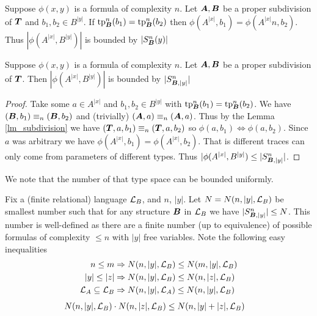 \documentclass{amsart}
\DeclareMathOperator{\TT}{\boldface T}
\DeclareMathOperator{\A}{\boldface A}
\DeclareMathOperator{\B}{\boldface B}
\begin{document}
\begin{Corollary} \label{cor_type_count}
	Suppose $\phi(x,y)$ is a formula of complexity $n$. Let $\A, \B$ be a proper subdivision of $\TT$ and $b_1, b_2 \in B^{|y|}$. If $\tp^n_{\B}(b_1) = \tp^n_{\B}(b_2)$ then $\phi(A^{|x|}, b_1) = \phi(A^{|x|} n, b_2)$. Thus $|\phi(A^{|x|}, B^{|y|})|$ is bounded by $|S^n_{\B}(y)|$
\end{Corollary}

\begin{Corollary} \label{cor_type_count}
	Suppose $\phi(x,y)$ is a formula of complexity $n$. Let $\A, \B$ be a proper subdivision of $\TT$. Then $|\phi(A^{|x|}, B^{|y|})|$ is bounded by $|S^n_{\B, |y|}|$
\end{Corollary}

\begin{proof}
	Take some $a \in A^{|x|}$ and $b_1, b_2 \in B^{|y|}$ with $\tp^n_{\B}(b_1) = \tp^n_{\B}(b_2)$. We have $(\B, b_1) \equiv_n (\B, b_2)$ and (trivially) $(\A, a) \equiv_n (\A, a)$. Thus by the Lemma \ref{lm_subdivision} we have $(\TT, a, b_1) \equiv_n (\TT, a, b_2)$ so $\phi(a, b_1) \iff \phi(a, b_2)$. Since $a$ was arbitrary we have $\phi(A^{|x|}, b_1) = \phi(A^{|x|}, b_2)$. That is different traces can only come from parameters of different types. Thus $|\phi(A^{|x|}, B^{|y|}) \leq |S^n_{\B, |y|}|$.
\end{proof}

We note that the number of that type space can be bounded uniformly.

\begin{Definition} \label{def_type_count}
	Fix a (finite relational) language $\mathcal L_B$, and $n$, $|y|$. Let $N = N(n, |y|, \mathcal L_B)$ be smallest number such that for any structure $\B$ in $\mathcal L_B$ we have $|S^n_{\B, |y|}| \leq N$. This number is well-defined as there are a finite number (up to equivalence) of possible formulas of complexity $\leq n$ with $|y|$ free variables. Note the following easy inequalities
	\begin{align*}
		n \leq m &\Rightarrow N(n, |y|, \mathcal L_B) \leq N(m, |y|, \mathcal L_B) \\
		|y| \leq |z| &\Rightarrow N(n, |y|, \mathcal L_B) \leq N(n, |z|, \mathcal L_B) \\
		\mathcal L_A \subseteq \mathcal L_B &\Rightarrow N(n, |y|, \mathcal L_A) \leq N(n, |y|, \mathcal L_B)
	\end{align*}
	\begin{align*}
		N(n, |y|, \mathcal L_B) \cdot N(n, |z|, \mathcal L_B) &\leq N(n, |y|+|z|, \mathcal L_B) 
	\end{align*}
\end{Definition}
\end{document}
